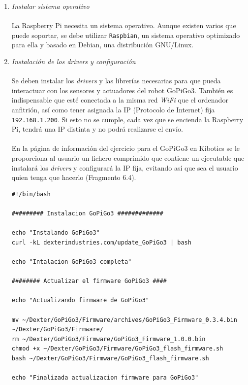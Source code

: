 \begin{enumerate}
	\item \textit{Instalar sistema operativo}
	\\
	\\
	La Raspberry Pi necesita un sistema operativo. Aunque existen varios que puede soportar, se debe utilizar \texttt{Raspbian}, un sistema operativo optimizado para ella y basado en Debian, una distribución GNU/Linux.
	\item \textit{Instalación de los drivers y configuración} 
	\\
	\\
	Se deben instalar los \textit{drivers} y las librerías necesarias para que pueda interactuar con los sensores y actuadores del robot GoPiGo3. También es indispensable que esté conectada a la misma red \textit{WiFi} que el ordenador anfitrión, así como tener asignada la IP (Protocolo de Internet) fija \texttt{192.168.1.200}. Si esto no se cumple, cada vez que se encienda la Raspberry Pi, tendrá una IP distinta y no podrá realizarse el envío.
	\\
	\\
	En la página de información del ejercicio para el GoPiGo3 en Kibotics se le proporciona al usuario un fichero comprimido que contiene un ejecutable que instalará los \textit{drivers} y configurará la IP fija, evitando así que sea el usuario quien tenga que hacerlo (Fragmento 6.4).
	\\
	\begin{lstlisting}[frame=single,breaklines=true, label=Ejecutable para la instalación y configuración de la Raspberry Pi, caption=Ejecutable para la instalación y configuración de la Raspberry Pi,  captionpos=b]
#!/bin/bash

######### Instalacion GoPiGo3 #############

echo "Instalando GoPiGo3"
curl -kL dexterindustries.com/update_GoPiGo3 | bash

echo "Intalacion GoPiGo3 completa"

######## Actualizar el firmware GoPiGo3 ####

echo "Actualizando firmware de GoPiGo3"

mv ~/Dexter/GoPiGo3/Firmware/archives/GoPiGo3_Firmware_0.3.4.bin ~/Dexter/GoPiGo3/Firmware/
rm ~/Dexter/GoPiGo3/Firmware/GoPiGo3_Firmware_1.0.0.bin
chmod +x ~/Dexter/GoPiGo3/Firmware/GoPiGo3_flash_firmware.sh
bash ~/Dexter/GoPiGo3/Firmware/GoPiGo3_flash_firmware.sh

echo "Finalizada actualizacion firmware para GoPiGo3"


\end{lstlisting}
\end{enumerate}
